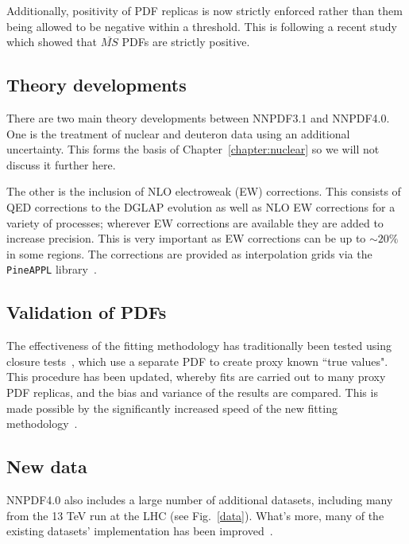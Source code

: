 Additionally, positivity of PDF replicas is now strictly enforced rather than them being allowed to be negative within a threshold. This is following a recent study~\cite{Candido:2020yat} which showed that $\overline{MS}$ PDFs are strictly positive. 

\subsection{Theory developments}
There are two main theory developments between NNPDF3.1 and NNPDF4.0. One is the treatment of nuclear and deuteron data using an additional uncertainty. This forms the basis of Chapter~\ref{chapter:nuclear} so we will not discuss it further here.

The other is the inclusion of NLO electroweak (EW) corrections. This consists of QED corrections to the DGLAP evolution as well as NLO EW corrections for a variety of processes; wherever EW corrections are available they are added to increase precision. This is very important as EW corrections can be up to $\sim 20\%$~\cite{Hollik:2004dz} in some regions. The corrections are provided as interpolation grids via the \texttt{PineAPPL} library~\cite{Carrazza:2020gss}.  

\subsection{Validation of PDFs}
The effectiveness of the fitting methodology has traditionally  been tested using closure tests~\cite{Ball:2014uwa}, which use a separate PDF to create proxy known ``true values". This procedure has been updated, whereby fits are carried out to many proxy PDF replicas, and the bias and variance of the results are compared. This is made possible by the significantly increased speed of the new fitting methodology~\cite{Carrazza:2019mzf}.

\subsection{New data}
NNPDF4.0 also includes a large number of additional datasets, including many from the 13 TeV run at the LHC (see Fig.~\ref{data}). What's more, many of the existing datasets' implementation has been improved~\cite{EmanueleTalk}.

